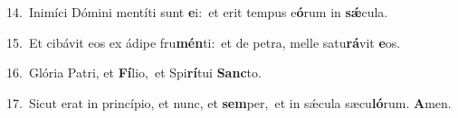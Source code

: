 {\numbfont\textcolor{\numbcolor}{14.}}~Inimíci Dómini mentíti sunt \textbf{e}\-i:~\star et erit tempus e\-\textbf{ó}\-rum in \textbf{sǽ}\-cula.\par
{\numbfont\textcolor{\numbcolor}{15.}}~Et cibávit eos ex ádipe fru\-\textbf{mén}\-ti:~\star et de petra, melle satu\-\textbf{rá}\-vit \textbf{e}\-os.\par
{\numbfont\textcolor{\numbcolor}{16.}}~Glória Patri, et \textbf{Fí}\-lio,~\star et Spi\-\textbf{rí}\-tui \textbf{Sanc}\-to.\par
{\numbfont\textcolor{\numbcolor}{17.}}~Sicut erat in princípio, et nunc, et \textbf{sem}\-per,~\star et in sǽcula sæcu\-\textbf{ló}\-rum. \textbf{A}\-men.\par
